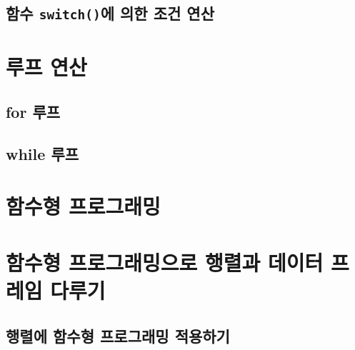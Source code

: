 \documentclass[
]{book}
\begin{document}
\hypertarget{uxd568uxc218-switchuxc5d0-uxc758uxd55c-uxc870uxac74-uxc5f0uxc0b0}{%
\subsection{\texorpdfstring{함수 \texttt{switch()}에 의한 조건 연산}{함수 switch()에 의한 조건 연산}}\label{uxd568uxc218-switchuxc5d0-uxc758uxd55c-uxc870uxac74-uxc5f0uxc0b0}}

\hypertarget{uxb8e8uxd504-uxc5f0uxc0b0}{%
\section{루프 연산}\label{uxb8e8uxd504-uxc5f0uxc0b0}}

\hypertarget{for-uxb8e8uxd504}{%
\subsection{for 루프}\label{for-uxb8e8uxd504}}

\hypertarget{while-uxb8e8uxd504}{%
\subsection{while 루프}\label{while-uxb8e8uxd504}}

\hypertarget{uxd568uxc218uxd615-uxd504uxb85cuxadf8uxb798uxbc0d}{%
\section{함수형 프로그래밍}\label{uxd568uxc218uxd615-uxd504uxb85cuxadf8uxb798uxbc0d}}

\hypertarget{uxd568uxc218uxd615-uxd504uxb85cuxadf8uxb798uxbc0duxc73cuxb85c-uxd589uxb82cuxacfc-uxb370uxc774uxd130-uxd504uxb808uxc784-uxb2e4uxb8e8uxae30}{%
\section{함수형 프로그래밍으로 행렬과 데이터 프레임 다루기}\label{uxd568uxc218uxd615-uxd504uxb85cuxadf8uxb798uxbc0duxc73cuxb85c-uxd589uxb82cuxacfc-uxb370uxc774uxd130-uxd504uxb808uxc784-uxb2e4uxb8e8uxae30}}

\hypertarget{uxd589uxb82cuxc5d0-uxd568uxc218uxd615-uxd504uxb85cuxadf8uxb798uxbc0d-uxc801uxc6a9uxd558uxae30}{%
\subsection{행렬에 함수형 프로그래밍 적용하기}\label{uxd589uxb82cuxc5d0-uxd568uxc218uxd615-uxd504uxb85cuxadf8uxb798uxbc0d-uxc801uxc6a9uxd558uxae30}}
\end{document}
